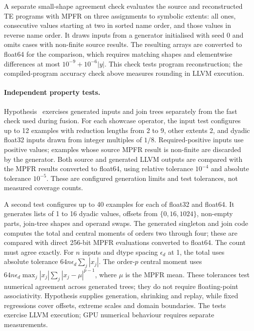 \documentclass[acmsmall,screen,review,anonymous,nonacm]{acmart}
\begin{document}
A separate small-shape agreement check evaluates the source and reconstructed TE programs with MPFR on three assignments to symbolic extents: all ones, consecutive values starting at two in sorted name order, and those values in reverse name order.
It draws inputs from a generator initialised with seed 0 and omits cases with non-finite source results.
The resulting arrays are converted to float64 for the comparison, which requires matching shapes and elementwise differences at most $10^{-9}+10^{-6}|y|$.
This check tests program reconstruction; the compiled-program accuracy check above measures rounding in LLVM execution.

\paragraph{Independent property tests.}
Hypothesis~\citep{hypothesis} exercises generated inputs and join trees separately from the fast check used during fusion.
For each showcase operator, the input test configures up to 12 examples with reduction lengths from 2 to 9, other extents 2, and dyadic float32 inputs drawn from integer multiples of $1/8$.
Required-positive inputs use positive values; examples whose source MPFR result is non-finite are discarded by the generator.
Both source and generated LLVM outputs are compared with the MPFR results converted to float64, using relative tolerance $10^{-4}$ and absolute tolerance $10^{-5}$.
These are configured generation limits and test tolerances, not measured coverage counts.

A second test configures up to 40 examples for each of float32 and float64.
It generates lists of 1 to 16 dyadic values, offsets from $\{0,16,1024\}$, non-empty parts, join-tree shapes and operand swaps.
The generated singleton and join code computes the total and central moments of orders two through four; these are compared with direct 256-bit MPFR evaluations converted to float64.
The count must agree exactly.
For $n$ inputs and dtype spacing $\epsilon_d$ at 1, the total uses absolute tolerance $64n\epsilon_d\sum_j|x_j|$.
The order-$p$ central moment uses $64n\epsilon_d\max_j|x_j|\sum_j|x_j-\mu|^{p-1}$, where $\mu$ is the MPFR mean.
These tolerances test numerical agreement across generated trees; they do not require floating-point associativity.
Hypothesis supplies generation, shrinking and replay, while fixed regressions cover offsets, extreme scales and domain boundaries.
The tests exercise LLVM execution; GPU numerical behaviour requires separate measurements.
\end{document}
